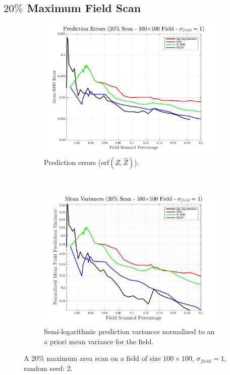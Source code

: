 \FloatBarrier
\clearpage
\subsection{$20\%$ Maximum Field Scan}
\begin{figure}[htb!]
    \centering
    \begin{subfigure}[t]{0.65\textwidth}
        \centering
        \includegraphics[width=\linewidth]{figures/hbresults/pred_errs_20p_100x100_sf_1_seed_2.png}
        \captionsetup{skip=0.20\baselineskip,size=footnotesize}
        \caption{Prediction errors (erf$(Z,\hat{Z})$).}
        \label{fig:prederrs_sigma1_p20_s2}
    \end{subfigure}%
    \\
    \begin{subfigure}[t]{0.65\textwidth}
        \centering
        \includegraphics[width=\linewidth]{figures/hbresults/vars_20p_100x100_sf_1_seed_2.png}
        \captionsetup{skip=0.20\baselineskip,size=footnotesize}
        \caption{Semi-logarithmic prediction variances normalized to an a priori mean variance for the field.}
        \label{fig:prederrs_sigma1_p20_s2}
    \end{subfigure}
    \captionsetup{skip=0.20\baselineskip}
    \caption{A $20\%$ maximum area scan on a field of size $100 \times 100$, $\sigma_{field} = 1$, random seed: 2.}
    \label{fig:sigma1_p20_s2}
\end{figure}

